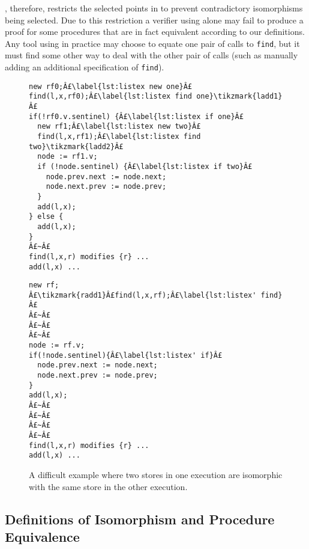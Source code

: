 \documentclass[runningheads,a4paper]{llncs}
\newcommand{\tikzmark}[1]{\tikz[overlay,remember picture] \node (#1) {};}
\begin{document}
\metho{}, therefore, restricts the selected points in  to prevent contradictory isomorphisms being selected. Due to this restriction a verifier using \metho{} alone may fail to produce a proof for some procedures that are in fact equivalent according to our definitions. Any tool using \metho{} in practice may choose to equate one pair of calls to \texttt{find}, but it must find some other way to deal with the other pair of calls (such as manually adding an additional specification of \texttt{find}). 

\begin{figure}[htbp]
\noindent\begin{minipage}{.48\textwidth}
\begin{lstlisting}[style=bl,name=copyex,firstnumber=auto]
new rf0;Â£\label{lst:listex new one}Â£
find(l,x,rf0);Â£\label{lst:listex find one}\tikzmark{ladd1}Â£
if(!rf0.v.sentinel) {Â£\label{lst:listex if one}Â£
  new rf1;Â£\label{lst:listex new two}Â£
  find(l,x,rf1);Â£\label{lst:listex find two}\tikzmark{ladd2}Â£
  node := rf1.v;
  if (!node.sentinel) {Â£\label{lst:listex if two}Â£
    node.prev.next := node.next;
    node.next.prev := node.prev;
  }
  add(l,x);
} else {
  add(l,x);
}
Â£~Â£
find(l,x,r) modifies {r} ...
add(l,x) ...
\end{lstlisting}
\end{minipage}%
\begin{minipage}{.48\textwidth}
\begin{lstlisting}[style=bl,name=copyex,firstnumber=auto]
new rf;
Â£\tikzmark{radd1}Â£find(l,x,rf);Â£\label{lst:listex' find}Â£
Â£~Â£
Â£~Â£
Â£~Â£
node := rf.v;
if(!node.sentinel){Â£\label{lst:listex' if}Â£
  node.prev.next := node.next;
  node.next.prev := node.prev;
}
add(l,x);
Â£~Â£
Â£~Â£
Â£~Â£
Â£~Â£
find(l,x,r) modifies {r} ...
add(l,x) ...
\end{lstlisting}
\end{minipage}%
\caption{A difficult example where two stores in one execution are isomorphic with the same store in the other execution\label{fig:listex}.}%
%
\end{figure}

\subsection{Definitions of Isomorphism and Procedure Equivalence}
\end{document}
